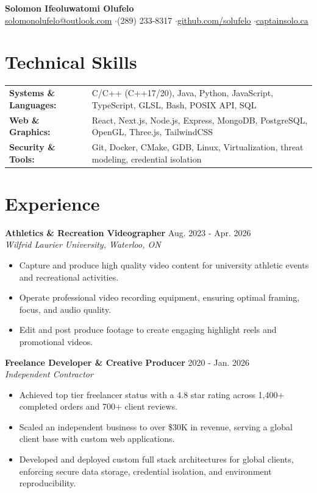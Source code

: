\documentclass[a4paper,10pt]{article}
\begin{document}
\begin{center}
    {\LARGE \textbf{Solomon Ifeoluwatomi Olufelo}} \\[2pt]
    \href{mailto:solomonolufelo@outlook.com}{solomonolufelo@outlook.com} \enspace$\cdot$\enspace (289) 233-8317 \enspace$\cdot$\enspace \href{https://github.com/solufelo}{github.com/solufelo} \enspace$\cdot$\enspace \href{https://captainsolo.ca}{captainsolo.ca}
\end{center}

\section*{Technical Skills}
\begin{tabularx}{\textwidth}{@{}lX@{}}
\textbf{Systems \& Languages:} & C/C++ (C++17/20), Java, Python, JavaScript, TypeScript, GLSL, Bash, POSIX API, SQL \\
\textbf{Web \& Graphics:} & React, Next.js, Node.js, Express, MongoDB, PostgreSQL, OpenGL, Three.js, TailwindCSS \\
\textbf{Security \& Tools:} & Git, Docker, CMake, GDB, Linux, Virtualization, threat modeling, credential isolation \\
\end{tabularx}

\section*{Experience}
\textbf{Athletics \& Recreation Videographer} \hfill Aug. 2023 - Apr. 2026 \\
\textit{Wilfrid Laurier University, Waterloo, ON}
\begin{itemize}
    \item Capture and produce high quality video content for university athletic events and recreational activities.
    \item Operate professional video recording equipment, ensuring optimal framing, focus, and audio quality.
    \item Edit and post produce footage to create engaging highlight reels and promotional videos.
\end{itemize}

\vspace{3pt}
\textbf{Freelance Developer \& Creative Producer} \hfill 2020 - Jan. 2026 \\
\textit{Independent Contractor}
\begin{itemize}
    \item Achieved top tier freelancer status with a 4.8 star rating across 1,400+ completed orders and 700+ client reviews.
    \item Scaled an independent business to over \$30K in revenue, serving a global client base with custom web applications.
    \item Developed and deployed custom full stack architectures for global clients, enforcing secure data storage, credential isolation, and environment reproducibility.
\end{itemize}
\end{document}
